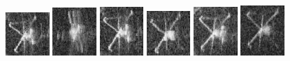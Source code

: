 \begin{figure}
    \includegraphics[width=0.15\textwidth]{chapters/images/dataset/all-class-images/valve/valve-54.jpg}
    \includegraphics[width=0.15\textwidth]{chapters/images/dataset/all-class-images/valve/valve-16.jpg}
    \includegraphics[width=0.15\textwidth]{chapters/images/dataset/all-class-images/valve/valve-60.jpg}
    \includegraphics[width=0.15\textwidth]{chapters/images/dataset/all-class-images/valve/valve-192.jpg}
    \includegraphics[width=0.15\textwidth]{chapters/images/dataset/all-class-images/valve/valve-89.jpg}
    \includegraphics[width=0.15\textwidth]{chapters/images/dataset/all-class-images/valve/valve-136.jpg}
    

\end{figure}

